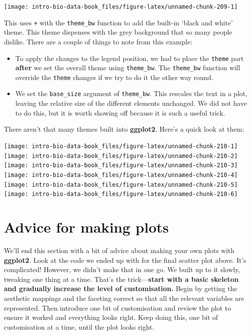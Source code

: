 \documentclass[
]{book}
\begin{document}
\begin{center}\texttt{[image: intro-bio-data-book\_files/figure-latex/unnamed-chunk-209-1]} \end{center}

This uses \texttt{+} with the \texttt{theme\_bw} function to add the built-in `black and white' theme. This theme dispenses with the grey background that so many people dislike. There are a couple of things to note from this example:

\begin{itemize}
\item
  To apply the changes to the legend position, we had to place the \texttt{theme} part \textbf{after} we set the overall theme using \texttt{theme\_bw}. The \texttt{theme\_bw} function will override the \texttt{theme} changes if we try to do it the other way round.
\item
  We set the \texttt{base\_size} argument of \texttt{theme\_bw}. This rescales the text in a plot, leaving the relative size of the different elements unchanged. We did not have to do this, but it is worth showing off because it is such a useful trick.
\end{itemize}

There aren't that many themes built into \textbf{ggplot2}. Here's a quick look at them:

\texttt{[image: intro-bio-data-book\_files/figure-latex/unnamed-chunk-210-1]} \texttt{[image: intro-bio-data-book\_files/figure-latex/unnamed-chunk-210-2]} \texttt{[image: intro-bio-data-book\_files/figure-latex/unnamed-chunk-210-3]} \texttt{[image: intro-bio-data-book\_files/figure-latex/unnamed-chunk-210-4]} \texttt{[image: intro-bio-data-book\_files/figure-latex/unnamed-chunk-210-5]} \texttt{[image: intro-bio-data-book\_files/figure-latex/unnamed-chunk-210-6]}

\hypertarget{advice-for-making-plots}{%
\section{Advice for making plots}\label{advice-for-making-plots}}

We'll end this section with a bit of advice about making your own plots with \textbf{ggplot2}. Look at the code we ended up with for the final scatter plot above. It's complicated! However, we didn't make that in one go. We built up to it slowly, tweaking one thing at a time. That's the trick---\textbf{start with a basic skeleton and gradually increase the level of customisation.} Begin by getting the aesthetic mappings and the faceting correct so that all the relevant variables are represented. Then introduce one bit of customisation and review the plot to ensure it worked and everything looks right. Keep doing this, one bit of customisation at a time, until the plot looks right.
\end{document}
